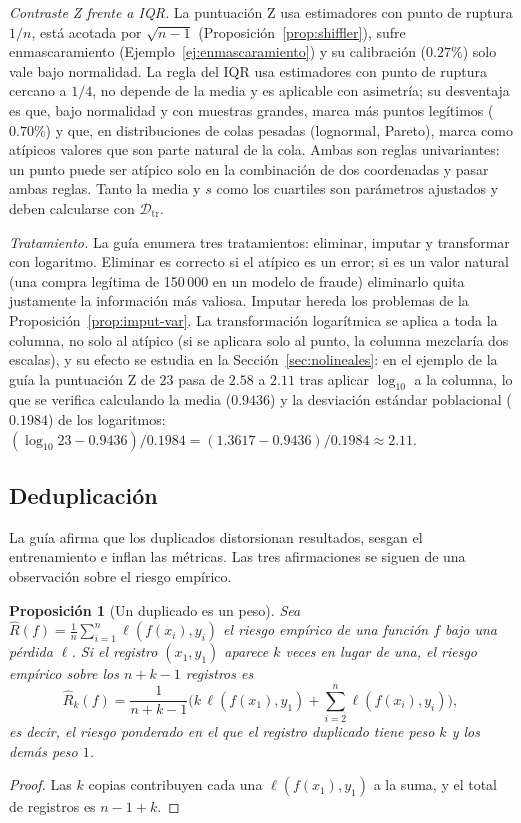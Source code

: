 \documentclass[11pt]{article}
\newtheorem{proposicion}[teorema]{Proposición}
\theoremstyle{definition}
\theoremstyle{remark}
\newcommand{\Dtr}{\mathcal{D}_{\mathrm{tr}}}
\begin{document}
\noindent \emph{Contraste Z frente a IQR.} La puntuación Z usa estimadores con punto de ruptura $1/n$, está acotada por $\sqrt{n-1}$ (Proposición~\ref{prop:shiffler}), sufre enmascaramiento (Ejemplo~\ref{ej:enmascaramiento}) y su calibración ($0.27\%$) solo vale bajo normalidad. La regla del IQR usa estimadores con punto de ruptura cercano a $1/4$, no depende de la media y es aplicable con asimetría; su desventaja es que, bajo normalidad y con muestras grandes, marca más puntos legítimos ($0.70\%$) y que, en distribuciones de colas pesadas (lognormal, Pareto), marca como atípicos valores que son parte natural de la cola. Ambas son reglas univariantes: un punto puede ser atípico solo en la combinación de dos coordenadas y pasar ambas reglas. Tanto la media y $s$ como los cuartiles son parámetros ajustados y deben calcularse con $\Dtr$.

\medskip

\noindent \emph{Tratamiento.} La guía enumera tres tratamientos: eliminar, imputar y transformar con logaritmo. Eliminar es correcto si el atípico es un error; si es un valor natural (una compra legítima de 150\,000 en un modelo de fraude) eliminarlo quita justamente la información más valiosa. Imputar hereda los problemas de la Proposición~\ref{prop:imput-var}. La transformación logarítmica se aplica a toda la columna, no solo al atípico (si se aplicara solo al punto, la columna mezclaría dos escalas), y su efecto se estudia en la Sección~\ref{sec:nolineales}: en el ejemplo de la guía la puntuación Z de $23$ pasa de $2.58$ a $2.11$ tras aplicar $\log_{10}$ a la columna, lo que se verifica calculando la media ($0.9436$) y la desviación estándar poblacional ($0.1984$) de los logaritmos: $(\log_{10}23-0.9436)/0.1984=(1.3617-0.9436)/0.1984\approx2.11$.

\subsection{Deduplicación}\label{sec:dedup}

\noindent La guía afirma que los duplicados distorsionan resultados, sesgan el entrenamiento e inflan las métricas. Las tres afirmaciones se siguen de una observación sobre el riesgo empírico.

\begin{proposicion}[Un duplicado es un peso]\label{prop:duplicado}
\noindent Sea $\hat R(f)=\frac1n\sum_{i=1}^n\ell(f(x_i),y_i)$ el riesgo empírico de una función $f$ bajo una pérdida $\ell$. Si el registro $(x_1,y_1)$ aparece $k$ veces en lugar de una, el riesgo empírico sobre los $n+k-1$ registros es
\[
\hat R_k(f)=\frac{1}{n+k-1}\Big(k\,\ell(f(x_1),y_1)+\sum_{i=2}^n\ell(f(x_i),y_i)\Big),
\]
es decir, el riesgo ponderado en el que el registro duplicado tiene peso $k$ y los demás peso $1$.
\end{proposicion}
\begin{proof}
\noindent Las $k$ copias contribuyen cada una $\ell(f(x_1),y_1)$ a la suma, y el total de registros es $n-1+k$.
\end{proof}
\end{document}
